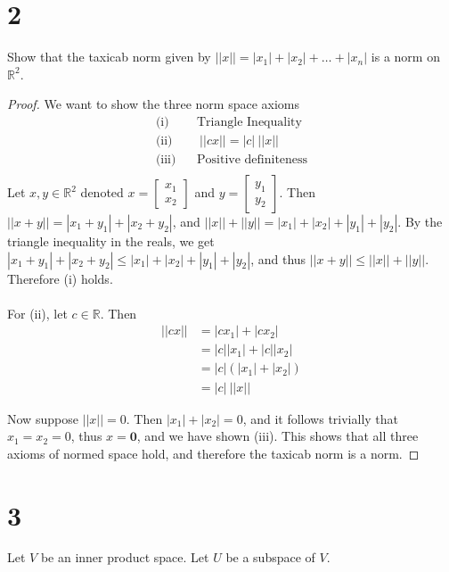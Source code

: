 \documentclass{article}
\begin{document}
\section*{2}
Show that the taxicab norm given by $||x|| = |x_1| + |x_2| + \dots + |x_n|$ is a norm on $\mathbb{R}^2$.

\begin{proof}
We want to show the three norm space axioms
\begin{align*}
\text{(i)} & \ \ \ \ \text{Triangle Inequality} \\
\text{(ii)} &  \ \ \ \ \ ||cx|| = |c| \ ||x|| \\
\text{(iii)} & \ \ \ \ \text{Positive definiteness} \\
\end{align*}
Let $x,y \in \mathbb{R}^2$ denoted $x = \begin{bmatrix}x_1\\x_2\end{bmatrix}$ and $y=\begin{bmatrix}y_1\\y_2\end{bmatrix}$. Then $||x+y|| = |x_1 + y_1| + |x_2 + y_2|$, and $||x|| +||y|| = |x_1| + |x_2| + |y_1| + |y_2|$. By the triangle inequality in the reals, we get $|x_1 + y_1| + |x_2 + y_2| \leqslant  |x_1| + |x_2| + |y_1| + |y_2|$, and thus $||x + y|| \leqslant ||x|| + ||y||$.  Therefore (i) holds.\\\\

For (ii), let $c \in \mathbb{R}$. Then
\begin{align*}
||cx|| & = |cx_1| + |cx_2|\\
& = |c||x_1| + |c||x_2| \\
& = |c|(|x_1| + |x_2|) \\
& = |c| \ ||x||
\end{align*}

Now suppose $||x|| = 0$. Then $|x_1| + |x_2| = 0$, and it follows trivially that $x_1 = x_2 = 0$, thus $x = \mathbf{0}$, and we have shown (iii). This shows that all three axioms of normed space hold, and therefore the taxicab norm is a norm.

\end{proof}

\section*{3}
Let $V$ be an inner product space. Let $U$ be a subspace of $V$.
\end{document}
